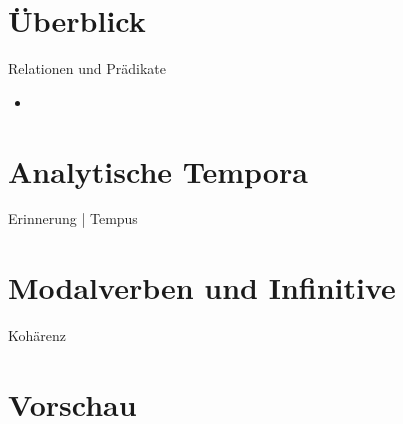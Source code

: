 
\section{Überblick}

\begin{frame}
  {Relationen und Prädikate}
  \begin{itemize}[<+->]
    \item \citet{Schaefer2018b}
  \end{itemize}
\end{frame}

\section{Analytische Tempora}

\begin{frame}
  {Erinnerung | Tempus}
\end{frame}

\section{Modalverben und Infinitive}

\begin{frame}
  {Kohärenz}
\end{frame}

\section{Vorschau}


